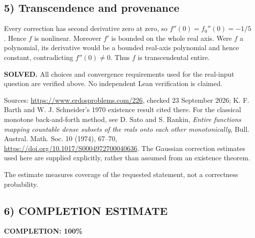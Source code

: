 \subsection*{5) Transcendence and provenance}
Every correction has second derivative zero at zero, so $f''(0)=f_0''(0)=-1/5$. Hence $f$ is nonlinear. Moreover $f'$ is bounded on the whole real axis. Were $f$ a polynomial, its derivative would be a bounded real-axis polynomial and hence constant, contradicting $f''(0)\ne0$. Thus $f$ is transcendental entire.

\textbf{SOLVED.} All choices and convergence requirements used for the real-input question are verified above. No independent Lean verification is claimed.

Sources: \url{https://www.erdosproblems.com/226}, checked 23 September 2026; K. F. Barth and W. J. Schneider's 1970 existence result cited there. For the classical monotone back-and-forth method, see D. Sato and S. Rankin, \emph{Entire functions mapping countable dense subsets of the reals onto each other monotonically}, Bull. Austral. Math. Soc. 10 (1974), 67--70, \url{https://doi.org/10.1017/S0004972700040636}. The Gaussian correction estimates used here are supplied explicitly, rather than assumed from an existence theorem.

The estimate measures coverage of the requested statement, not a correctness probability.
\subsection*{6) COMPLETION ESTIMATE}
\textbf{COMPLETION: 100\%}
